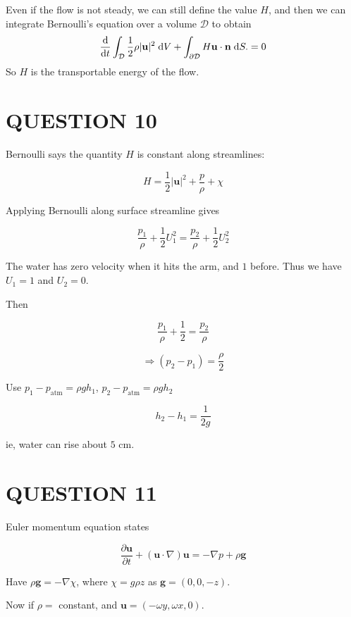 \documentclass[a4paper]{article}
\begin{document}
Even if the flow is not steady, we can still define the value $H$, and then we can integrate Bernoulli's equation over a volume $\mathcal{D}$ to obtain
\[
\frac{\mathrm{d}}{\mathrm{d} t}\int_{\mathcal{D}} \frac{1}{2}\rho |\mathbf{u}|^2 \;\mathrm{d} V + \int_{\partial \mathcal{D}} H \mathbf{u}\cdot \mathbf{n} \;\mathrm{d} S. = 0 
\]
So $H$ is the transportable energy of the flow.




\section{QUESTION 10}

Bernoulli says the quantity $ H $ is constant along streamlines:

\[ H = \frac{1}{2} | \mathbf{u} |^{2} + \frac{p}{\rho} + \chi \]

Applying Bernoulli along surface streamline gives

\[ \frac{p_{1}}{\rho} + \frac{1}{2} U_{1}^{2} = \frac{p_{2}}{\rho} + \frac{1}{2} U_{2}^{2} \]

The water has zero velocity when it hits the arm, and $ 1 $ before. Thus we have $ U_{1} =1  $ and $ U_{2} = 0 $. 


Then

\[ \frac{p_{1}}{\rho} + \frac{1}{2} = \frac{p_{2}}{\rho} \]

\[ \Rightarrow (p_{2} - p_{1} ) = \frac{\rho}{2} \]

Use $ p_{1} - p_{\text{atm}} = \rho g h_{1} $, $ p_{2} - p_{\text{atm}} = \rho g h_{2} $ 

\[ h_{2} - h_{1} = \frac{1}{2g} \]

ie, water can rise about $ 5 \text{ cm} $. 








\section{QUESTION 11}

Euler momentum equation states

\[\frac{\partial \mathbf{u} }{\partial t } + (\mathbf{u} \cdot \nabla ) \mathbf{u} = - \nabla  p + \rho \mathbf{g} \]

Have $  \rho \mathbf{g} = - \nabla  \chi  $, where $ \chi = g \rho z $ as $ \mathbf{g} = (0,0,-z) $.

Now if $ \rho = $ constant, and $ \mathbf{u} = (- \omega y, \omega x,0) $.
\end{document}

